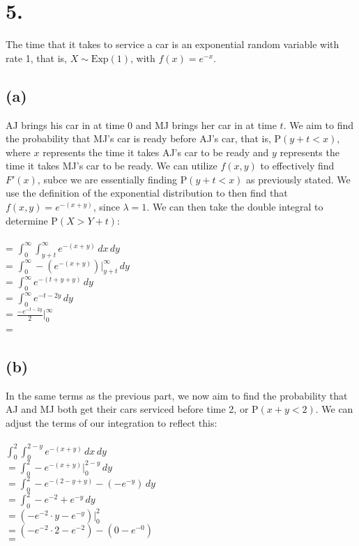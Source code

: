 \documentclass{article}
\begin{document}
\section*{5.}
{\Large 
The time that it takes to service a car is an exponential random variable with rate 1, that is, $X \sim \text{Exp}(1)$, with $f(x) = e^{-x}$.

\subsection*{(a)}
AJ brings his car in at time 0 and MJ brings her car in at time $t$. We aim to find the probability that MJ’s car is ready before AJ’s car, that is, P$(y + t < x)$, where $x$ represents the time it takes AJ's car to be ready and $y$ represents the time it takes MJ's car to be ready. We can utilize $f(x, y)$ to effectively find $F'(x)$, subce we are essentially finding P$(y + t < x)$ as previously stated. We use the definition of the exponential distribution to then find that $f(x, y) = e^{-(x + y)}$, since $\lambda = 1$.
We can then take the double integral to determine P$(X > Y + t)$: \\ \\
= $\int_{0}^{\infty} \int_{y + t}^{\infty} e^{-(x + y)} \,dx \,dy$ \\
= $\int_{0}^{\infty} -(e^{-(x + y)}) |_{y + t}^{\infty} \,dy$ \\ 
= $\int_{0}^{\infty} e^{-(t + y + y)} \,dy$ \\ 
= $\int_{0}^{\infty} e^{-t - 2y} \,dy$ \\
= $\frac{-e^{-t - 2y}}{2} |_{0}^{\infty}$ \\
= 

\subsection*{(b)}
In the same terms as the previous part, we now aim to find the probability that AJ and MJ both get their cars serviced before time 2, or P$(x + y < 2)$. We can adjust the terms of our integration to reflect this: \\ \\
$\int_{0}^{2} \int_{0}^{2 - y} e^{-(x + y)} \,dx \,dy$ \\ 
$= \int_{0}^{2} -e^{-(x + y)} |_{0}^{2-y} \,dy$ \\
$ = \int_{0}^{2} -e^{-(2 - y + y)} - (-e^{-y}) \,dy$ \\ 
$ = \int_{0}^{2} -e^{-2} + e^{-y} \,dy$ \\ 
$ = (-e^{-2} \cdot y - e^{-y}) |_{0}^{2} $ \\
$ = (-e^{-2} \cdot 2 - e^{-2}) - (0 - e^{-0})$ \\
$ = $ 

}
\end{document}
